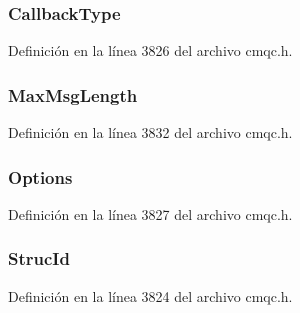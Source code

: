 \subsubsection[{Callback\+Type}]{ Callback\+Type}\label{structtag_m_q_c_b_d_ae3bab36f44b94fe301ca31e17eb7a0e4}


Definición en la línea 3826 del archivo cmqc.\+h.

\hypertarget{structtag_m_q_c_b_d_ae36dc482f00cf723ee5d9302dd75c620}{}
\subsubsection[{Max\+Msg\+Length}]{ Max\+Msg\+Length}\label{structtag_m_q_c_b_d_ae36dc482f00cf723ee5d9302dd75c620}


Definición en la línea 3832 del archivo cmqc.\+h.

\hypertarget{structtag_m_q_c_b_d_ad7aff2d6c6044809464380998d24ec5c}{}
\subsubsection[{Options}]{ Options}\label{structtag_m_q_c_b_d_ad7aff2d6c6044809464380998d24ec5c}


Definición en la línea 3827 del archivo cmqc.\+h.

\hypertarget{structtag_m_q_c_b_d_a0530922ca944569b52601d74941f96e4}{}
\subsubsection[{Struc\+Id}]{ Struc\+Id}\label{structtag_m_q_c_b_d_a0530922ca944569b52601d74941f96e4}


Definición en la línea 3824 del archivo cmqc.\+h.

\hypertarget{structtag_m_q_c_b_d_a0656ef8f766b3907d394d88a35d7b7e9}{}
